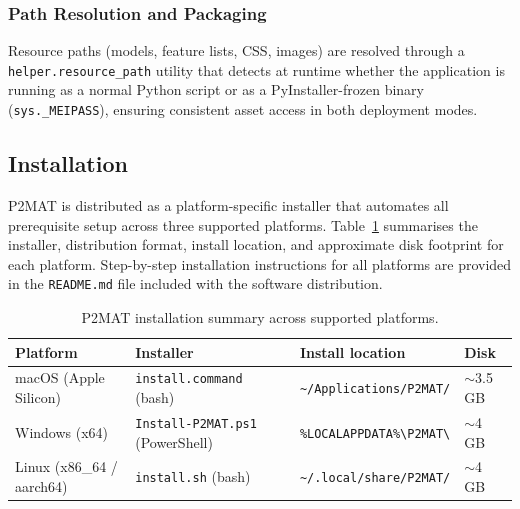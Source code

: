 \subsubsection*{Path Resolution and Packaging}
Resource paths (models, feature lists, CSS, images) are resolved through a
\texttt{helper.resource\_path} utility that detects at runtime whether the
application is running as a normal Python script or as a PyInstaller-frozen
binary (\texttt{sys.\_MEIPASS}), ensuring consistent asset access in both
deployment modes.

\subsection{Installation}
\label{subsec:installation}

P2MAT is distributed as a platform-specific installer that automates all
prerequisite setup across three supported platforms.
Table~\ref{tab:install} summarises the installer, distribution format,
install location, and approximate disk footprint for each platform.
Step-by-step installation instructions for all platforms are provided in the
\texttt{README.md} file included with the software distribution.

\begin{table}[htbp]
\centering
\caption{P2MAT installation summary across supported platforms.}
\label{tab:install}
\begin{tabular}{p{3.2cm} p{3.8cm} p{4.2cm} p{1.2cm}}
\hline
\textbf{Platform} & \textbf{Installer} & \textbf{Install location} & \textbf{Disk} \\
\hline
macOS (Apple Silicon) & \texttt{install.command} (bash) & \texttt{\textasciitilde/Applications/P2MAT/} & $\sim$3.5\,GB \\
Windows (x64) & \texttt{Install-P2MAT.ps1} (PowerShell) & \texttt{\%LOCALAPPDATA\%\textbackslash P2MAT\textbackslash} & $\sim$4\,GB \\
Linux (x86\_64 / aarch64) & \texttt{install.sh} (bash) & \texttt{\textasciitilde/.local/share/P2MAT/} & $\sim$4\,GB \\
\hline
\end{tabular}
\end{table}

